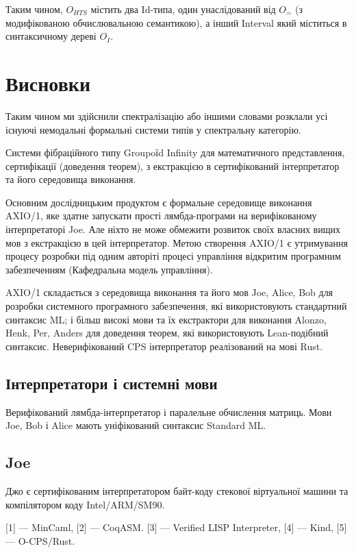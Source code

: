 Таким чином,
$O_{HTS}$ містить два Id-типа, один унаслідований від $O_=$ (з модифікованою
обчислювальною семантикою), а інший Interval який міститься в синтаксичному дереві $O_I$.

\newpage
\section{Висновки}

Таким чином ми здійснили спектралізацію або іншими словами розклали усі
існуючі немодальні формальні системи типів у спектральну категорію.

Системи фібраційного типу Groupoїd Infinity для математичного представлення,
сертифікації (доведення теорем), з екстракцією в сертифікований інтерпретатор
та його середовища виконання.

Основним дослідницьким продуктом є формальне середовище виконання AXIO/1,
яке здатне запускати прості лямбда-програми на верифікованому інтерпретаторі Joe.
Але ніхто не може обмежити розвиток своїх власних вищих мов з екстракцією в цей інтерпретатор.
Метою створення AXIO/1 є утримування процесу розробки під одним авторіті процесі управління
відкритим програмним забезпеченням (Кафедральна модель управління).

AXIO/1 складається з середовища виконання та його мов Joe, Alice, Bob для розробки системного
програмного забезпечення, які використовують стандартний синтаксис ML; і більш високі
мови та їх екстрактори для виконання Alonzo, Henk, Per, Anders для доведення теорем,
які використовують Lean-подібний синтаксис. Неверифікований CPS інтерпретатор реалізований
на мові Rust.

\newpage
\subsection*{Інтерпретатори і системні мови}

Верифікований лямбда-інтерпретатор і паралельне обчислення матриць. Мови Joe,
Bob і Alice мають уніфікований синтаксис Standard ML.

\subsection*{Joe}

Джо є сертифікованим інтерпретатором байт-коду стекової віртуальної машини
та компілятором коду Intel/ARM/SM90.

[1] — MinCaml, [2] — CoqASM. [3] — Verified LISP Interpreter, [4] — Kind, [5] — O-CPS/Rust.

